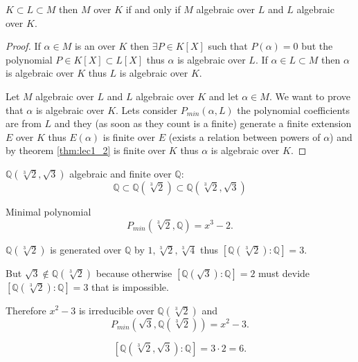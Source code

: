 \begin{theorem}
  $K \subset L \subset M$ then $M$ 
  over $K$ if and only if $M$ algebraic over $L$ and $L$ algebraic
  over $K$. 
  \begin{proof}
    If $\alpha \in M$ is an  over $K$ then
    $\exists P \in K\left[X\right]$ such that
    $P\left(\alpha\right) = 0$ but the
    polynomial $P \in K\left[X\right] \subset L\left[X\right]$
    thus $\alpha$ is algebraic over $L$.
    If $\alpha \in L \subset M$ then $\alpha$ is algebraic over $K$
    thus $L$ is algebraic over $K$.

    Let $M$ algebraic over $L$ and $L$ algebraic over $K$ and let
    $\alpha \in M$. We want to prove that $\alpha$ is algebraic over
    $K$. Lets consider $P_{min}\left(\alpha, L\right)$ the polynomial
    coefficients are from $L$ and they (as soon as they count is a
    finite)  generate a finite extension $E$ over $K$ thus
    $E\left(\alpha\right)$ is finite over $E$ (exists a relation
    between powers of $\alpha$) and by theorem
    \ref{thm:lec1_2} is finite over $K$ thus $\alpha$ is algebraic
    over $K$.
  \end{proof}
\end{theorem}
\begin{example}
  $\mathbb{Q}\left( \sqrt[3]{2}, \sqrt{3}\right)$ algebraic and finite
  over $\mathbb{Q}$:
  \[
  \mathbb{Q} \subset \mathbb{Q}\left( \sqrt[3]{2}\right)
  \subset \mathbb{Q}\left( \sqrt[3]{2}, \sqrt{3}\right)
  \]

  Minimal polynomial
  \[
  P_{min}\left(\sqrt[3]{2}, \mathbb{Q}\right) = x^3 - 2.
  \]

  $\mathbb{Q}\left( \sqrt[3]{2}\right)$ is generated over $\mathbb{Q}$
  by $1, \sqrt[3]{2}, \sqrt[3]{4}$ thus
  $\left[\mathbb{Q}\left( \sqrt[3]{2}\right): \mathbb{Q}\right] = 3$.

  But $\sqrt{3} \notin \mathbb{Q}\left( \sqrt[3]{2}\right)$ because
  otherwise $\left[\mathbb{Q}\left( \sqrt{3}\right): \mathbb{Q}\right]
  = 2$ must devide  
  $\left[\mathbb{Q}\left( \sqrt[3]{2}\right): \mathbb{Q}\right] = 3$
  that is impossible.

  Therefore $x^2 - 3$ is irreducible over
  $\mathbb{Q}\left( \sqrt[3]{2}\right)$ and
  \[
  P_{min}\left(\sqrt{3}, \mathbb{Q}\left( \sqrt[3]{2}\right)\right) =
  x^2 - 3.
  \]

  \[
  \left[\mathbb{Q}\left( \sqrt[3]{2}, \sqrt{3}\right):
    \mathbb{Q}\right] = 3 \cdot 2 = 6.
  \]
\end{example}

